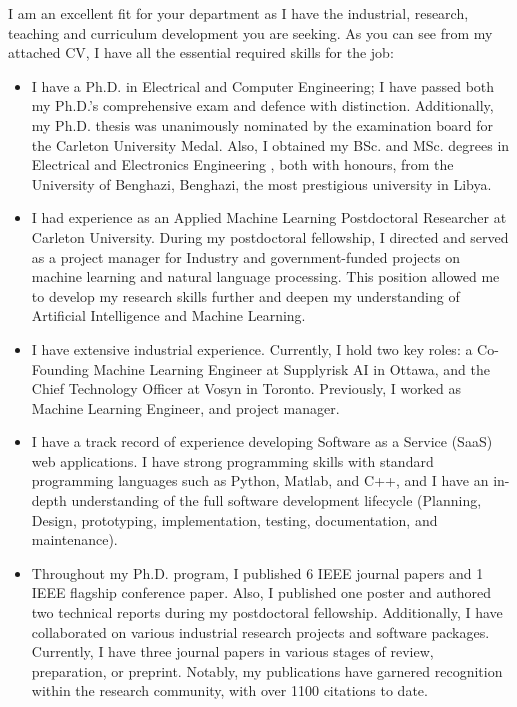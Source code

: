 \documentclass[letterpaper,11pt,oneside]{article}
\newcommand{\ignore}[1]{}
\begin{document}
\vspace{1em}

I am an excellent fit for your department as I have the industrial, research, teaching and curriculum development \ignore{, and funding experience} you are seeking. As you can see from my attached CV, I have all the essential required skills for the job:

\begin{itemize}
    \item I have a  Ph.D. in Electrical and Computer Engineering; I have passed both my Ph.D.'s comprehensive exam and defence with distinction. Additionally, my Ph.D. thesis was unanimously nominated by the examination board for the Carleton University Medal. Also, I obtained my BSc. and MSc. degrees in Electrical and Electronics Engineering , both with honours, from the University of Benghazi, Benghazi, the most prestigious university in Libya.
    \item I had experience as an Applied Machine Learning Postdoctoral Researcher at Carleton University. 
    During my postdoctoral fellowship, I directed and served as a project manager for Industry and government-funded projects on machine learning and natural language processing. This position allowed me to develop my research skills further and deepen my understanding of Artificial Intelligence and Machine Learning.
    \item I have extensive industrial experience. Currently, I hold two key roles: a Co-Founding Machine Learning Engineer at Supplyrisk AI in Ottawa, and the Chief Technology Officer at Vosyn in Toronto.  Previously, I worked as Machine Learning Engineer, and project manager. 
    \item    I have a track record of experience developing Software as a Service (SaaS) web applications. I have strong programming skills with standard programming languages such as Python, Matlab, and C++, and  I have an in-depth understanding of the full software development lifecycle (Planning, Design, prototyping, implementation, testing, documentation, and maintenance).
    \item Throughout my Ph.D. program, I published 6 IEEE journal papers and 1 IEEE flagship conference paper. Also, I published one poster and authored two technical reports during my postdoctoral fellowship. Additionally, I have collaborated on various industrial research projects and software packages. Currently, I have three journal papers in various stages of review, preparation, or preprint. Notably, my publications have garnered recognition within the research community, with over 1100 citations to date.

\end{itemize}
\end{document}
